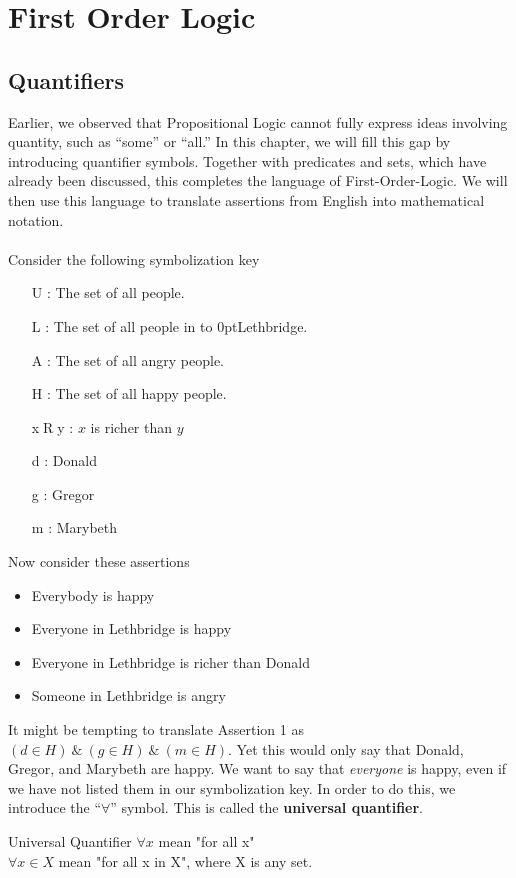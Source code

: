 \documentclass[../MATH-2000-Notes.tex]{subfiles}
\begin{document}
\chapter{First Order Logic}
\section{Quantifiers}
Earlier, we observed that Propositional Logic cannot fully express ideas involving quantity, such as ``some'' or ``all.''  In this chapter, we will fill this gap by introducing quantifier symbols. Together with predicates and sets, which have already been discussed, this completes the language of First-Order-Logic. We will then use this language to translate assertions from English into mathematical notation.
\\~\\
Consider the following symbolization key
\begin{itemize}
    \item[U]: The set of all people.
    \item[L]: The set of all people in \hbox to 0pt{Lethbridge.\hss} %
    \item[A]: The set of all angry people.
    \item[H]: The set of all happy people.
    \item [x$\mathrel{R}$y]: $x$ is richer than $y$
    \item [d]: Donald
    \item [g]: Gregor
    \item [m]: Marybeth
\end{itemize}
Now consider these assertions
\begin{itemize}
    \item Everybody is happy
    \item Everyone in Lethbridge is happy
    \item Everyone in Lethbridge is richer than Donald
    \item Someone in Lethbridge is angry
\end{itemize}
It might be tempting to translate Assertion 1 as $(d \in H)\ \&\ (g \in H)\ \&\ (m \in H)$. Yet this would only say that Donald, Gregor, and Marybeth are happy. We want to say that \emph{everyone} is happy, even if we have not listed them in our symbolization key. In order to do this, we introduce the ``$\forall$'' symbol. This is called the \textbf{universal quantifier}.
\begin{Definition}
    {Universal Quantifier}
    \(\forall x\) mean "for all x"\\
    \(\forall x \in X\) mean "for all x in X", where X is any set.
\end{Definition}
\end{document}
